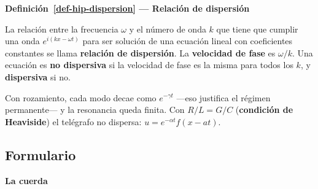 \documentclass[
  spanish,
  a4paper,
]{scrbook}
\theoremstyle{definition}
\theoremstyle{plain}
\theoremstyle{definition}
\theoremstyle{plain}
\theoremstyle{definition}
\theoremstyle{remark}
\begin{document}
\begin{tcolorbox}[enhanced jigsaw, arc=.35mm, bottomrule=.15mm, breakable, colback=white, colframe=quarto-callout-note-color-frame, left=2mm, leftrule=.75mm, opacityback=0, rightrule=.15mm, toprule=.15mm]
\begin{minipage}[t]{5.5mm}
\textcolor{quarto-callout-note-color}{\faInfo}
\end{minipage}%
\begin{minipage}[t]{\textwidth - 5.5mm}

\vspace{-3mm}\textbf{Definición~\ref{def-hip-dispersion} --- Relación de dispersión}\vspace{3mm}

La relación entre la frecuencia \(\omega\) y el número de onda \(k\) que
tiene que cumplir una onda \(e^{i(kx-\omega t)}\) para ser solución de
una ecuación lineal con coeficientes constantes se llama
\textbf{relación de dispersión}. La \textbf{velocidad de fase} es
\(\omega/k\). Una ecuación es \textbf{no dispersiva} si la velocidad de
fase es la misma para todos los \(k\), y \textbf{dispersiva} si no.

\end{minipage}%
\end{tcolorbox}

Con rozamiento, cada modo decae como \(e^{-\gamma t}\) ---eso justifica
el régimen permanente--- y la resonancia queda finita. Con \(R/L = G/C\)
(\textbf{condición de Heaviside}) el telégrafo no dispersa:
\(u = e^{-\alpha t}f(x-at)\).

\subsection{Formulario}\label{sec-hip-resumen-11}

\textbf{La cuerda}
\end{document}

